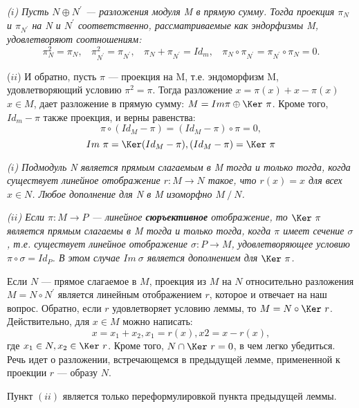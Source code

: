 \begin{lemma}
\hspace*{0.5cm}

\textit{($i$) Пусть $N \oplus N^{'}$ — разложения модуля M в прямую сумму. Тогда проекция $\pi_N$ и $\pi_{N^{'}}$ на N и $N^{'}$ соответственно, рассматриваемые как эндорфизмы M, удовлетворяют соотношениям:}
$$\pi^{2}_{N} = \pi_{N},~~~~ \pi^{2}_{N^{'}} = \pi_{N^{'}},
~~~~\pi_{N} + \pi_{N^{'}} = Id_m,~~~~  \pi_{N} \circ \pi_{N^{'}} = \pi_{N^{'}} \circ \pi_{N} = 0. $$

($ii$) И обратно, пусть $\pi$ — проекция на M, т.е. эндоморфизм M, удовлетворяющий условию $\pi^{2} = \pi$. Тогда разложение $x = \pi(x) + x - \pi(x)$ $ x \in M$, дает разложение в прямую сумму: $M = Im \pi \oplus \Ker ~\pi$. Кроме того, $Id_m - \pi$ также проекция, и верны равенства:
$$ \pi \circ (Id_{M} -\pi) = (Id_{M} -\pi) \circ \pi = 0, $$
$$ Im~\pi = \Ker(Id_{M} -\pi), (Id_{M} -\pi) = \Ker~ \pi $$
\end{lemma}
\begin{lemma}
\hspace*{0.5cm}

\textit{($i$) Подмодуль N является прямым слагаемым в M тогда и только тогда, когда существует линейное отображение $r: M \rightarrow N$ такое, что $r(x) = x$ для всех $x \in N$. Любое дополнение для N в M изоморфно $M~/~N$.}

\textit{($ii$) Если $\pi: M \rightarrow P$ — линейное \textbf{сюръективное} отображение, то $\Ker~\pi$ является прямым слагаемы в M тогда и только тогда, когда $\pi$ имеет сечение $\sigma$, т.е. существует линейное отображение $\sigma: P \rightarrow M$, удовлетворяющее условию $\pi \circ \sigma = Id_P$. В этом случае $Im~ \sigma$ является дополнением для $\Ker~\pi$.}\\
\end{lemma}

\newpage

\begin{myproof}
Если $N$ — прямое слагаемое в $M$, проекция из $M$ на $N$ относительно разложения $M = N \circ N^{'}$ является линейным отображением $r$, которое и отвечает на наш вопрос. Обратно, если $r$ удовлетворяет условию леммы, то $M = N \circ \Ker~r$. Действительно, для $x \in M$ можно написать:
$$x = x_1 + x_2, x_1= r(x), x2 = x - r(x),$$
где $x_1 \in N, x_2 \in \Ker~r$. Кроме того, $N \cap \Ker~r = 0$, в чем легко убедиться. Речь идет о разложении, встречающемся в предыдущей лемме, примененной к проекции $r$ — образу $N$.

\noindent Пункт $(ii)$ является только переформулировкой пункта предыдущей леммы.
\end{myproof}

